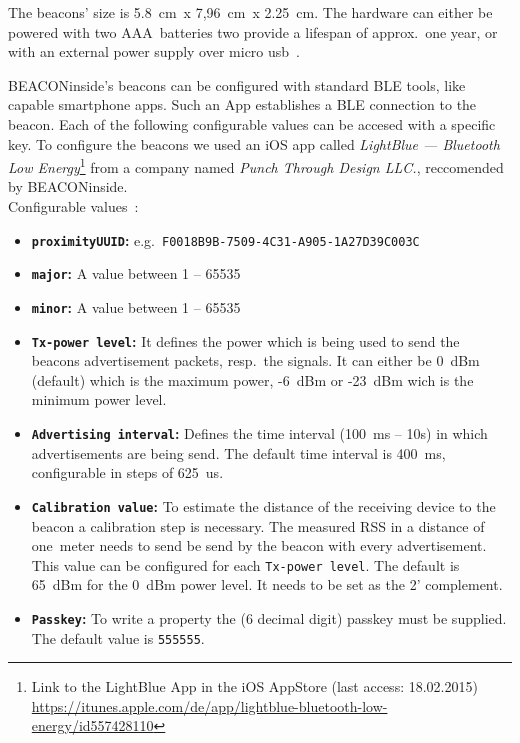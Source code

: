 The beacons' size is 5.8~cm~x 7,96~cm~x 2.25~cm.
The hardware can either be powered with two AAA~batteries two provide a lifespan of approx.\ one year, or with an external power supply over micro usb~\cite{binside:ds}.

BEACONinside's beacons can be configured with standard \acs{BLE} tools, like capable smartphone apps.
Such an App establishes a \acs{BLE} connection to the beacon.
Each of the following configurable values can be accesed with a specific key.
To configure the beacons we used an iOS app called \textit{LightBlue --- Bluetooth Low Energy}\footnote{Link to the LightBlue App in the iOS AppStore (last access: 18.02.2015) \url{https://itunes.apple.com/de/app/lightblue-bluetooth-low-energy/id557428110}} from a company named \textit{Punch Through Design LLC.}, reccomended by BEACONinside.\\
\newline
Configurable values~\cite{binside:ds}:
\begin{itemize}
  \item \textbf{\texttt{proximityUUID}:} e.g.\ \texttt{F0018B9B-7509-4C31-A905-1A27D39C003C}
  \item \textbf{\texttt{major}:} A value between 1 -- 65535
  \item \textbf{\texttt{minor}:} A value between 1 -- 65535
  \item \textbf{\texttt{Tx-power level}:} It defines the power which is being used to send the beacons advertisement packets, resp.\ the signals. It can either be 0~dBm (default) which is the maximum power, -6~dBm or -23~dBm wich is the minimum power level.
  \item \textbf{\texttt{Advertising interval}:} Defines the time interval (100~ms -- 10s) in which advertisements are being send. The default time interval is 400~ms, configurable in steps of 625~us.
  \item \textbf{\texttt{Calibration value}:} To estimate the distance of the receiving device to the beacon a calibration step is necessary. The measured \acs{RSS} in a distance of one~meter needs to send be send by the beacon with every advertisement. This value can be configured for each \texttt{Tx-power level}. The default is 65~dBm for the 0~dBm power level. It needs to be set as the 2' complement.
  \item \textbf{\texttt{Passkey}:} To write a property the (6 decimal digit) passkey must be supplied. The default value is \texttt{555555}.
\end{itemize}

